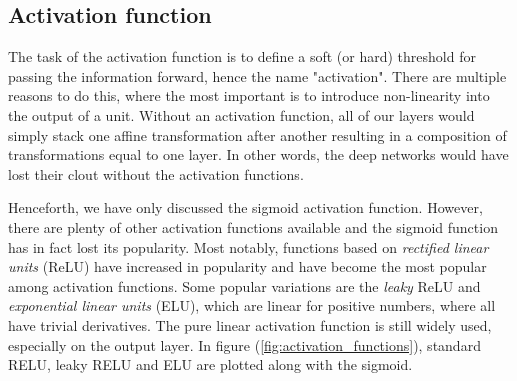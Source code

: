 \subsection{Activation function}
The task of the activation function is to define a soft (or hard) threshold for passing the information forward, hence the name "activation". There are multiple reasons to do this, where the most important is to introduce non-linearity into the output of a unit. Without an activation function, all of our layers would simply stack one affine transformation after another resulting in a composition of transformations equal to one layer. In other words, the deep networks would have lost their clout without the activation functions. 

Henceforth, we have only discussed the sigmoid activation function. However, there are plenty of other activation functions available and the sigmoid function has in fact lost its popularity. Most notably, functions based on \textit{rectified linear units} (ReLU) have increased in popularity and have become the most popular among activation functions. Some popular variations are the \textit{leaky} ReLU and \textit{exponential linear units} (ELU), which are linear for positive numbers, where all have trivial derivatives. The pure linear activation function is still widely used, especially on the output layer. In figure (\ref{fig:activation_functions}), standard RELU, leaky RELU and ELU are plotted along with the sigmoid.


